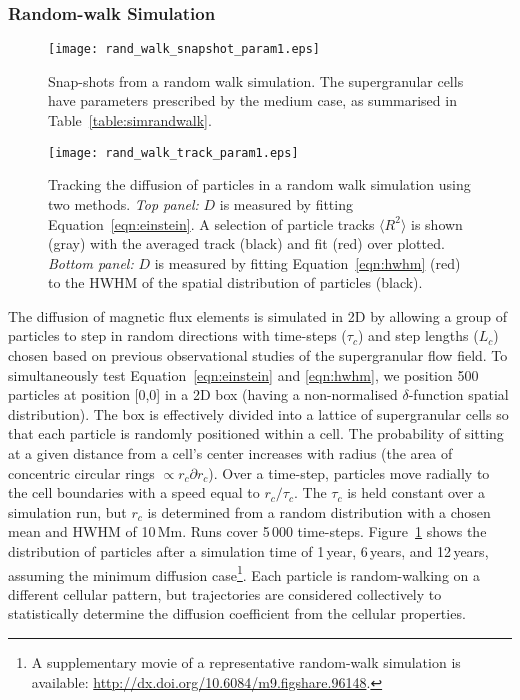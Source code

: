 \subsubsection{Random-walk Simulation}\label{sect:simrandwalk}

 \begin{figure}[!t]
   \centerline{\texttt{[image: rand\_walk\_snapshot\_param1.eps]}}
              \caption[A random walk simulation.]{Snap-shots from a random walk simulation. The supergranular cells have parameters prescribed by the medium case, as summarised in Table~\ref{table:simrandwalk}.}
   \label{fig:randomwalk}
   \end{figure}

 \begin{figure}[!t]
   \centerline{\texttt{[image: rand\_walk\_track\_param1.eps]}}
              \caption[The results of a random walk simulation.]{Tracking the diffusion of particles in a random walk simulation using two methods. \emph{Top panel:} $D$ is measured by fitting Equation~\ref{eqn:einstein}. A selection of particle tracks $\langle R^2 \rangle$ is shown (gray) with the averaged track (black) and fit (red) over plotted. \emph{Bottom panel:} $D$ is measured by fitting Equation~\ref{eqn:hwhm} (red) to the HWHM of the spatial distribution of particles (black).}
   \label{fig:fitrandomwalk}
   \end{figure}

The diffusion of magnetic flux elements is simulated in 2D by allowing a group of particles to step in random directions with time-steps ($\tau_c$) and step lengths ($L_c$) chosen based on previous observational studies of the supergranular flow field. To simultaneously test Equation~\ref{eqn:einstein} and \ref{eqn:hwhm}, we position 500 particles at position [0,0] in a 2D box (having a non-normalised $\delta$-function spatial distribution). The box is effectively divided into a lattice of supergranular cells so that each particle is randomly positioned within a cell. The probability of sitting at a given distance from a cell's center increases with radius (the area of concentric circular rings $\propto r_c \partial r_c$). Over a time-step, particles move radially to the cell boundaries with a speed equal to $r_c / \tau_c$. The $\tau_c$ is held constant over a simulation run, but $r_c$ is determined from a random distribution with a chosen mean and HWHM of 10\,Mm. Runs cover 5\,000 time-steps. Figure~\ref{fig:randomwalk} shows the distribution of particles after a simulation time of 1\,year, 6\,years, and 12\,years, assuming the minimum diffusion case\footnote{A supplementary movie of a representative random-walk simulation is available: \url{http://dx.doi.org/10.6084/m9.figshare.96148}.}. Each particle is random-walking on a different cellular pattern, but trajectories are considered collectively to statistically determine the diffusion coefficient from the cellular properties. 

